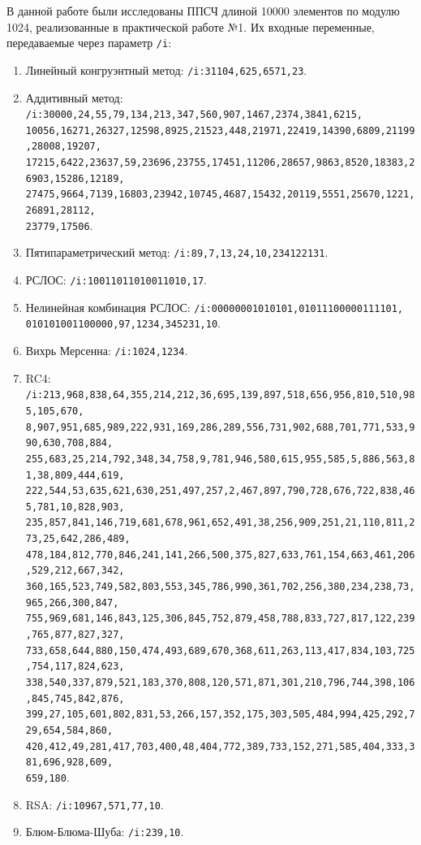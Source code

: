 \documentclass[bachelor, och, labwork]{SCWorks}
\begin{document}
В данной работе были исследованы ППСЧ длиной 10000 элементов по модулю 1024, реализованные в практической работе №1. Их входные переменные, передаваемые через параметр \texttt{/i}:
\begin{enumerate}
  \item Линейный конгруэнтный метод: \texttt{/i:31104,625,6571,23}.
  \item Аддитивный метод: {\footnotesize\texttt{/i:30000,24,55,79,134,213,347,560,907,1467,2374,3841,6215,\\10056,16271,26327,12598,8925,21523,448,21971,22419,14390,6809,21199,28008,19207,\\17215,6422,23637,59,23696,23755,17451,11206,28657,9863,8520,18383,26903,15286,12189,\\27475,9664,7139,16803,23942,10745,4687,15432,20119,5551,25670,1221,26891,28112,\\23779,17506}}.
  \item Пятипараметрический метод: {\footnotesize\texttt{/i:89,7,13,24,10,234122131}}.
  \item РСЛОС: {\footnotesize\texttt{/i:10011011010011010,17}}.
  \item Нелинейная комбинация РСЛОС: {\footnotesize\texttt{/i:00000001010101,01011100000111101,\\010101001100000,97,1234,345231,10}}.
  \item Вихрь Мерсенна: {\footnotesize\texttt{/i:1024,1234}}.
  \item RC4: {\footnotesize\texttt{/i:213,968,838,64,355,214,212,36,695,139,897,518,656,956,810,510,985,105,670,\\8,907,951,685,989,222,931,169,286,289,556,731,902,688,701,771,533,990,630,708,884,\\255,683,25,214,792,348,34,758,9,781,946,580,615,955,585,5,886,563,81,38,809,444,619,\\222,544,53,635,621,630,251,497,257,2,467,897,790,728,676,722,838,465,781,10,828,903,\\235,857,841,146,719,681,678,961,652,491,38,256,909,251,21,110,811,273,25,642,286,489,\\478,184,812,770,846,241,141,266,500,375,827,633,761,154,663,461,206,529,212,667,342,\\360,165,523,749,582,803,553,345,786,990,361,702,256,380,234,238,73,965,266,300,847,\\755,969,681,146,843,125,306,845,752,879,458,788,833,727,817,122,239,765,877,827,327,\\733,658,644,880,150,474,493,689,670,368,611,263,113,417,834,103,725,754,117,824,623,\\338,540,337,879,521,183,370,808,120,571,871,301,210,796,744,398,106,845,745,842,876,\\399,27,105,601,802,831,53,266,157,352,175,303,505,484,994,425,292,729,654,584,860,\\420,412,49,281,417,703,400,48,404,772,389,733,152,271,585,404,333,381,696,928,609,\\659,180}}.
  \item RSA: {\footnotesize\texttt{/i:10967,571,77,10}}.
  \item Блюм-Блюма-Шуба: {\footnotesize\texttt{/i:239,10}}.
\end{enumerate}
\end{document}
